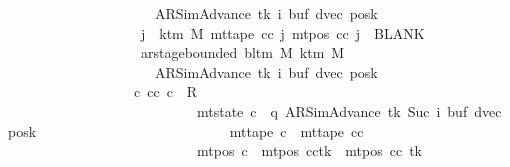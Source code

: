 \begin{isabellebody}
\ \ \ \ \ \ \ \ \ \ \ \ \ \ \ \ \ \ \ \ \ {\isacharparenleft}{\kern0pt}AR{\isacharunderscore}{\kern0pt}SimAdvance{\isacharcomma}{\kern0pt}\ tk{\isacharcomma}{\kern0pt}\ i{\isacharcomma}{\kern0pt}\ buf{\isacharcomma}{\kern0pt}\ dvec{\isacharcomma}{\kern0pt}\ posk{\isacharparenright}{\kern0pt}{\isacharsemicolon}{\kern0pt}\isanewline
\ \ \ \ \ \ \ \ \ \ \ \ \ \ \ \ \ \ \ {\isasymforall}j\ {\isasymge}\ k{\isacharunderscore}{\kern0pt}tm\ M{\isachardot}{\kern0pt}\ mt{\isacharunderscore}{\kern0pt}tape\ cc\ j\ {\isacharparenleft}{\kern0pt}mt{\isacharunderscore}{\kern0pt}pos\ cc\ j{\isacharparenright}{\kern0pt}\ {\isacharequal}{\kern0pt}\ BLANK{}{\isacharsemicolon}{\kern0pt}\isanewline
\ \ \ \ \ \ \ \ \ \ \ \ \ \ \ \ \ \ \ ar{\isacharunderscore}{\kern0pt}stage{\isacharunderscore}{\kern0pt}bounded\ {\isacharparenleft}{\kern0pt}bl{\isacharunderscore}{\kern0pt}tm\ M{\isacharparenright}{\kern0pt}\ {\isacharparenleft}{\kern0pt}k{\isacharunderscore}{\kern0pt}tm\ M{\isacharparenright}{\kern0pt}\isanewline
\ \ \ \ \ \ \ \ \ \ \ \ \ \ \ \ \ \ \ \ \ {\isacharparenleft}{\kern0pt}AR{\isacharunderscore}{\kern0pt}SimAdvance{\isacharcomma}{\kern0pt}\ tk{\isacharcomma}{\kern0pt}\ i{\isacharcomma}{\kern0pt}\ buf{\isacharcomma}{\kern0pt}\ dvec{\isacharcomma}{\kern0pt}\ posk{\isacharparenright}{\kern0pt}\ {\isasymrbrakk}\isanewline
\ \ \ \ \ \ \ \ \ \ \ \ \ \ \ \ \ {\isasymLongrightarrow}\ {\isasymexists}c{\isacharprime}{\kern0pt}{\isacharprime}{\kern0pt}{\isachardot}{\kern0pt}\ {\isacharparenleft}{\kern0pt}cc{\isacharcomma}{\kern0pt}\ c{\isacharprime}{\kern0pt}{\isacharprime}{\kern0pt}{\isacharparenright}{\kern0pt}\ {\isasymin}\ R{\isacharprime}{\kern0pt}\isanewline
\ \ \ \ \ \ \ \ \ \ \ \ \ \ \ \ \ \ \ \ \ \ \ \ \ \ {\isasymand}\ mt{\isacharunderscore}{\kern0pt}state\ c{\isacharprime}{\kern0pt}{\isacharprime}{\kern0pt}\ {\isacharequal}{\kern0pt}\ {\isacharparenleft}{\kern0pt}q{\isacharcomma}{\kern0pt}\ AR{\isacharunderscore}{\kern0pt}SimAdvance{\isacharcomma}{\kern0pt}\ tk{\isacharcomma}{\kern0pt}\ Suc\ i{\isacharcomma}{\kern0pt}\ buf{\isacharcomma}{\kern0pt}\ dvec{\isacharcomma}{\kern0pt}\ posk{\isacharparenright}{\kern0pt}\isanewline
\ \ \ \ \ \ \ \ \ \ \ \ \ \ \ \ \ \ \ \ \ \ \ \ \ \ {\isasymand}\ mt{\isacharunderscore}{\kern0pt}tape\ c{\isacharprime}{\kern0pt}{\isacharprime}{\kern0pt}\ {\isacharequal}{\kern0pt}\ mt{\isacharunderscore}{\kern0pt}tape\ cc\isanewline
\ \ \ \ \ \ \ \ \ \ \ \ \ \ \ \ \ \ \ \ \ \ \ \ \ \ {\isasymand}\ mt{\isacharunderscore}{\kern0pt}pos\ c{\isacharprime}{\kern0pt}{\isacharprime}{\kern0pt}\ {\isacharequal}{\kern0pt}\ {\isacharparenleft}{\kern0pt}mt{\isacharunderscore}{\kern0pt}pos\ cc{\isacharparenright}{\kern0pt}{\isacharparenleft}{\kern0pt}tk\ {\isacharcolon}{\kern0pt}{\isacharequal}{\kern0pt}\ mt{\isacharunderscore}{\kern0pt}pos\ cc\ tk\ {\isacharminus}{\kern0pt}\ {}{\isacharparenright}{\kern0pt}{\isachardoublequoteclose}\isanewline

\end{isabellebody}
